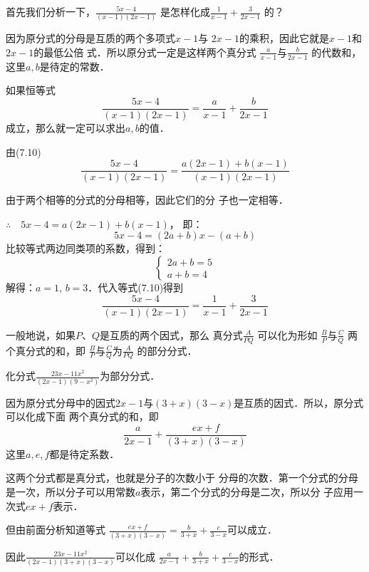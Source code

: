 首先我们分析一下，$\frac{5x-4}{(x-1)(2x-1)}$
是怎样化成$\frac{1}{x-1}+\frac{3}{2x-1}$
的？


因为原分式的分母是互质的两个多项式$x-1$与
$2x-1$的乘积，因此它就是$x-1$和$2x-1$的最低公倍
式．所以原分式一定是这样两个真分式
$\frac{a}{x-1}$与$\frac{b}{2x-1}$
的代数和，这里$a,b$是待定的常数．

如果恒等式
\begin{equation}
    \frac{5x-4}{(x-1)(2x-1)}=\frac{a}{x-1}+\frac{b}{2x-1}
\end{equation}
成立，那么就一定可以求出$a,b$的值．

由(7.10)
\[    \frac{5x-4}{(x-1)(2x-1)}=\frac{a(2x-1)+b(x-1)}{(x-1)(2x-1)}\]

由于两个相等的分式的分母相等，因此它们的分
子也一定相等．

$\therefore\quad 5x-4=a(2x-1)+b(x-1)$，
即：
\[5x-4=(2a+b)x-(a+b)\]
比较等式两边同类项的系数，得到：
\[\begin{cases}
    2a+b=5\\  a+b=4
\end{cases}\]
解得：$a=1$, $b=3$．代入等式(7.10)得到
\[\frac{5x-4}{(x-1)(2x-1)}=\frac{1}{x-1}+\frac{3}{2x-1}\]

一般地说，如果$P$、$Q$是互质的两个因式，那么
真分式$\frac{A}{PQ}$
可以化为形如
$\frac{B}{P}$与$\frac{C}{Q}$
两个真分式的和，即
$\frac{B}{P}$与$\frac{C}{Q}$为$\frac{A}{PQ}$
的部分分式．

\begin{example}
    化分式$\frac{23x-11x^2}{(2x-1)(9-x^2)}$为部分分式．
\end{example}

\begin{analyze}
    因为原分式分母中的因式$2x-1$与$(3+x)(3-x)$是互质的因式．所以，原分式可以化成下面
两个真分式的和，即
\[\frac{a}{2x-1}+\frac{ex+f}{(3+x)(3-x)}\]
这里$a,e,f$都是待定系数．

这两个分式都是真分式，也就是分子的次数小于
分母的次数．第一个分式的分母是一次，所以分子可以用常数$a$表示，第二个分式的分母是二次，所以分
子应用一次式$ex+f$表示．

但由前面分析知道等式
$\frac{ex+f}{(3+x)(3-x)}=\frac{b}{3+x}+\frac{c}{3-x}$可以成立．

因此$\frac{23x-11x^2}{(2x-1)(3+x)(3-x)}$可以化成 $\frac{a}{2x-1}+\frac{b}{3+x}+\frac{c}{3-x}$的形式．
\end{analyze}

